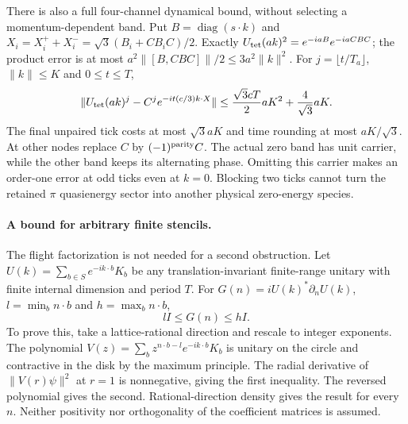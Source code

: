 There is also a full four-channel dynamical bound, without selecting a
momentum-dependent band. Put $B=\operatorname{diag}(s\cdot k)$ and
$X_i=X_i^++X_i^-=\sqrt3(B_i+CB_iC)/2$.
Exactly $U_{\rm tet}(ak)^2=e^{-iaB}e^{-iaCBC}$; the product error is
at most $a^2\|[B,CBC]\|/2\leq3a^2\|k\|^2$.
For $j=\lfloor t/T_a\rfloor$, $\|k\|\leq K$ and $0\leq t\leq T$,
\[
 \|U_{\rm tet}(ak)^j-C^j e^{-it(c/3)k\cdot X}\|
 \leq \frac{\sqrt3 cT}{2}aK^2+\frac4{\sqrt3}aK.
\]
The final unpaired tick costs at most $\sqrt3aK$ and time rounding at
most $aK/\sqrt3$. At other nodes replace $C$ by $(-1)^{\rm parity}C$.
The actual zero band has unit carrier, while the other band keeps its
alternating phase. Omitting this carrier makes an order-one error at odd
ticks even at $k=0$. Blocking two ticks cannot turn the retained $\pi$
quasienergy sector into another physical zero-energy species.

\paragraph{A bound for arbitrary finite stencils.}
The flight factorization is not needed for a second obstruction. Let
$U(k)=\sum_{b\in S}e^{-ik\cdot b}K_b$ be any translation-invariant
finite-range unitary with finite internal dimension and period $T$.
For $G(n)=iU(k)^*\partial_nU(k)$, $l=\min_b n\cdot b$ and
$h=\max_b n\cdot b$,
\[
 lI\leq G(n)\leq hI.
 \tag{QT1b}
\]
To prove this, take a lattice-rational direction and rescale to integer
exponents. The polynomial
$V(z)=\sum_bz^{n\cdot b-l}e^{-ik\cdot b}K_b$ is unitary on the circle
and contractive in the disk by the maximum principle. The radial derivative
of $\|V(r)\psi\|^2$ at $r=1$ is nonnegative, giving the first inequality.
The reversed polynomial gives the second. Rational-direction density gives
the result for every $n$. Neither positivity nor orthogonality of the
coefficient matrices is assumed.

